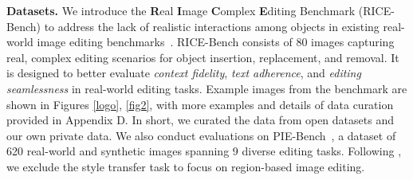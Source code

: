 \documentclass{article}
\begin{document}
\textbf{Datasets.} We introduce the \textbf{R}eal \textbf{I}mage \textbf{C}omplex \textbf{E}diting Benchmark ({RICE-Bench}) to address the lack of realistic interactions among objects in existing real-world image editing benchmarks~\citep{sheynin2024emu,gu2024multi}. RICE-Bench consists of 80 images capturing real, complex editing scenarios for object insertion, replacement, and removal. It is designed to better evaluate \textit{context fidelity}, \textit{text adherence}, and \textit{editing seamlessness} in real-world editing tasks. Example images from the benchmark are shown in {Figures \ref{logo}, \ref{fig2}}, with more examples and details of data curation provided in Appendix D. In short, we curated the data from open datasets \citep{wasserman2024paint,ju2024pnp} and our own private data.
We also conduct evaluations on PIE-Bench~\cite{ju2024pnp}, a dataset of 620 real-world and synthetic images spanning 9 diverse editing tasks.
Following \cite{li2024brushedit, xu2023infedit, zhu2025kv}, we exclude the style transfer task to focus on region-based image editing.

\end{document}
